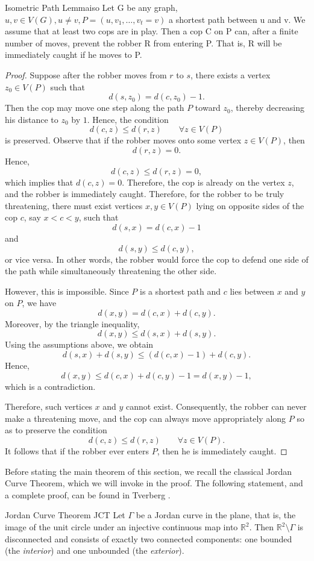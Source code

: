 \documentclass[12pt, a4paper]{article}
\begin{document}
\begin{lemma}{Isometric Path Lemma}{iso}
    Let G be any graph, $u,v \in V(G) , u \neq v, P = (u, v_1, \dots, v_t = v)$ a shortest path between u and v. We assume that at least two cops are in play. Then a cop C on P can, after a finite number of moves, prevent the robber R from entering P.  That is, R will be immediately caught if he moves to P.
\end{lemma}
\begin{proof}
Suppose after the robber moves from \(r\) to \(s\), there exists a vertex \(z_0 \in V(P)\) such that
\[
d(s,z_0)=d(c,z_0)-1.
\]
Then the cop may move one step along the path \(P\) toward \(z_0\), thereby decreasing his distance to \(z_0\) by \(1\). Hence, the condition
\[
d(c,z)\leq d(r,z)\qquad \forall z\in V(P)
\]
is preserved.
Observe that if the robber moves onto some vertex \(z \in V(P)\), then
\[
d(r,z)=0.
\]
Hence,
\[
d(c,z)\leq d(r,z)=0,
\]
which implies that \(d(c,z)=0\). Therefore, the cop is already on the vertex \(z\), and the robber is immediately caught.
Therefore, for the robber to be truly threatening, there must exist vertices \(x,y\in V(P)\) lying on opposite sides of the cop \(c\), say \(x<c<y\), such that
\[
d(s,x)=d(c,x)-1
\]
and
\[
d(s,y)\leq d(c,y),
\]
or vice versa. In other words, the robber would force the cop to defend one side of the path while simultaneously threatening the other side.

However, this is impossible. Since \(P\) is a shortest path and \(c\) lies between \(x\) and \(y\) on \(P\), we have
\[
d(x,y)=d(c,x)+d(c,y).
\]
Moreover, by the triangle inequality,
\[
d(x,y)\leq d(s,x)+d(s,y).
\]
Using the assumptions above, we obtain
\[
d(s,x)+d(s,y)
\leq (d(c,x)-1)+d(c,y).
\]
Hence,
\[
d(x,y)\leq d(c,x)+d(c,y)-1
= d(x,y)-1,
\]
which is a contradiction.

Therefore, such vertices \(x\) and \(y\) cannot exist. Consequently, the robber can never make a threatening move, and the cop can always move appropriately along \(P\) so as to preserve the condition
\[
d(c,z)\leq d(r,z)\qquad \forall z\in V(P).
\]
It follows that if the robber ever enters \(P\), then he is immediately caught.
\end{proof}

Before stating the main theorem of this section, we recall the classical Jordan Curve Theorem, which we will invoke in the proof. The following statement, and a complete proof, can be found in Tverberg \cite{tverberg1980jordan}.

\begin{theorem}{Jordan Curve Theorem \textnormal{\cite{tverberg1980jordan}}}{JCT}
    Let $\Gamma$ be a Jordan curve in the plane, that is, the image of the unit circle under an injective continuous map into $\mathbb{R}^2$. Then $\mathbb{R}^2 \setminus \Gamma$ is disconnected and consists of exactly two connected components: one bounded (the \emph{interior}) and one unbounded (the \emph{exterior}).
\end{theorem}
\end{document}
